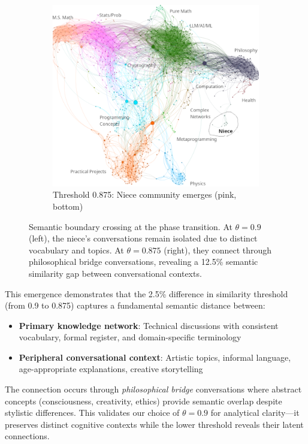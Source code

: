 \begin{figure}[h]
\begin{subfigure}{0.48\textwidth}
    \includegraphics[width=\textwidth]{./images/0.875-wild-better.png}
    \caption{Threshold 0.875: Niece community emerges (pink, bottom)}
    \label{fig:network_0875}
\end{subfigure}
\caption{Semantic boundary crossing at the phase transition. At $\theta=0.9$ (left), the niece's conversations remain isolated due to distinct vocabulary and topics. At $\theta=0.875$ (right), they connect through philosophical bridge conversations, revealing a 12.5\% semantic similarity gap between conversational contexts.}
\label{fig:niece_emergence}
\end{figure}

This emergence demonstrates that the 2.5\% difference in similarity threshold (from 0.9 to 0.875) captures a fundamental semantic distance between:
\begin{itemize}
    \item \textbf{Primary knowledge network}: Technical discussions with consistent vocabulary, formal register, and domain-specific terminology
    \item \textbf{Peripheral conversational context}: Artistic topics, informal language, age-appropriate explanations, creative storytelling
\end{itemize}

The connection occurs through \emph{philosophical bridge} conversations where abstract concepts (consciousness, creativity, ethics) provide semantic overlap despite stylistic differences. This validates our choice of $\theta=0.9$ for analytical clarity—it preserves distinct cognitive contexts while the lower threshold reveals their latent connections.

